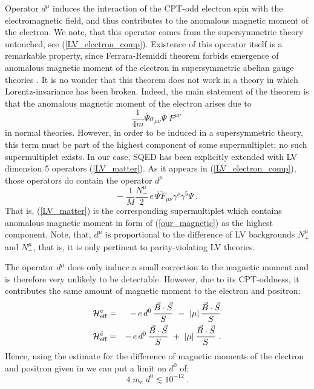 \documentclass[12pt]{revtex4}
\begin{document}
Operator $ d^\mu $ induces the interaction of the
CPT-odd electron spin with the electromagnetic field,
and thus contributes to the anomalous magnetic
moment of the electron.
We note, that this operator comes from the supersymmetric
theory untouched, see (\ref{LV_electron_comp}).
Existence of this operator itself is a remarkable
property, since Ferrara-Remiddi theorem  
forbids emergence of anomalous magnetic moment of the
electron in supersymmetric abelian gauge theories
\cite{Ferrara:1974wb}.
It is no wonder that this theorem does not work in a theory
in which Lorentz-invariance has been broken.
Indeed, the main statement of the theorem is that 
the anomalous magnetic moment of the electron arises
due to 
\begin{equation}
\label{magnetic}
	\frac{1}{4m} \overline{\Psi} \sigma_{\mu\nu} \Psi \; F^{\mu\nu}~
\end{equation}
in normal theories. 
However, in order to be induced in a supersymmetric theory, 
this term must be part of the highest component of some supermultiplet;
no such supermultiplet exists.
In our case, SQED has been explicitly extended with LV dimension
5 operators (\ref{LV_matter}). 
As it appears in (\ref{LV_electron_comp}), those operators
do contain the operator $ d^\mu $
\begin{equation}
\label{our_magnetic}
	-\; \frac{1}{M} \frac{N_-^\mu}{2}\,
	 e\, \overline{\Psi} \widetilde{F}_{\mu\nu}
                    \gamma^\nu \gamma^5 \Psi~.
\end{equation}
That is, 
(\ref{LV_matter}) is the corresponding supermultiplet which contains
anomalous magnetic moment in form of (\ref{our_magnetic}) as the highest component.
Note, that, $ d^\mu $ is proportional to the difference of LV backgrounds
$ N_+^\mu $ and $ N_-^\mu $, that is, it is only pertinent to
parity-violating LV theories.

The operator $ d^\mu $ does only induce a small correction
to the magnetic moment and is therefore very unlikely to
be detectable.
However, due to its CPT-oddness, it contributes
the same amount of magnetic moment to the electron and positron:
\begin{eqnarray*}
 \mathcal{H}_{\rm eff}^{e} & = & 
-\, e\, d^0\, \frac{\vec{B}\cdot\vec{S}}{S}
~-~ 
|\mu|\, \frac{\vec{B}\cdot\vec{S}}{S}
\\
 \mathcal{H}_{\rm eff}^{\bar{e}} & = & 
-\, e\, d^0\, \frac{\vec{B}\cdot\vec{S}}{S}
~+~ 
|\mu|\, \frac{\vec{B}\cdot\vec{S}}{S}~.
\end{eqnarray*}
Hence, using the estimate for the difference
of magnetic moments of the electron and positron given
in
\cite{PDBook}
we can put a limit on $ d^0 $ of:
\begin{equation}
4 \; m_e \; d^0 \lesssim 10^{-12}
~.
\end{equation}
\end{document}
